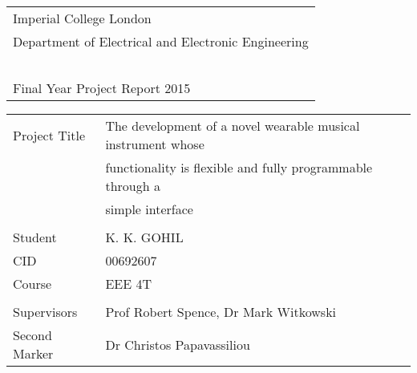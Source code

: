 \thispagestyle{empty}

\large
\begin{tabular}{|l}
Imperial College London\\
Department of Electrical and Electronic Engineering\\~\\
Final Year Project Report 2015
\end{tabular}

\vspace{150pt}
\begin{figure}[H]
   \centering
\end{figure}


\vfill

\begin{tabular}{| l l}
Project Title & The development of a novel wearable musical instrument whose \\
& functionality is flexible and fully programmable through a \\ & simple interface \\
&\\
Student & K. K. GOHIL \\ 
CID & 00692607 \\ 
Course & EEE 4T \\ &\\
Supervisors & Prof Robert Spence, Dr Mark Witkowski \\ 
Second Marker & Dr Christos Papavassiliou 
\end{tabular}
\normalsize
\newpage